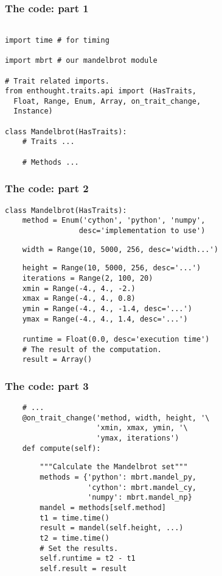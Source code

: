 \documentclass[14pt,compress]{beamer}
\newcounter{time}
\begin{document}
\begin{frame}
  \frametitle{The code: part 1}
  \vspace*{-3em}
\small
\begin{lstlisting}

import time # for timing

import mbrt # our mandelbrot module

# Trait related imports.
from enthought.traits.api import (HasTraits, 
  Float, Range, Enum, Array, on_trait_change,
  Instance)

class Mandelbrot(HasTraits):
    # Traits ...

    # Methods ...
  \end{lstlisting}
\end{frame}

\begin{frame}
  \frametitle{The code: part 2}
\small
\begin{lstlisting}
class Mandelbrot(HasTraits):
    method = Enum('cython', 'python', 'numpy', 
                 desc='implementation to use')
\end{lstlisting}
\pause
\vspace*{-1em}
\begin{lstlisting}
    width = Range(10, 5000, 256, desc='width...')
\end{lstlisting}
\pause
\vspace*{-1em}
\begin{lstlisting}
    height = Range(10, 5000, 256, desc='...')
    iterations = Range(2, 100, 20)
    xmin = Range(-4., 4., -2.)
    xmax = Range(-4., 4., 0.8)
    ymin = Range(-4., 4., -1.4, desc='...')
    ymax = Range(-4., 4., 1.4, desc='...')

    runtime = Float(0.0, desc='execution time')
    # The result of the computation.
    result = Array()
  \end{lstlisting}
\end{frame}

\begin{frame}
  \frametitle{The code: part 3}
\small
\begin{lstlisting}
    # ...
    @on_trait_change('method, width, height, '\
                     'xmin, xmax, ymin, '\
                     'ymax, iterations')
    def compute(self):
\end{lstlisting}
\pause
\vspace*{-1em}
\begin{lstlisting}
        """Calculate the Mandelbrot set"""
        methods = {'python': mbrt.mandel_py, 
                   'cython': mbrt.mandel_cy,
                   'numpy': mbrt.mandel_np}
        mandel = methods[self.method]
        t1 = time.time()
        result = mandel(self.height, ...)
        t2 = time.time()
        # Set the results.
        self.runtime = t2 - t1
        self.result = result
  \end{lstlisting}
\end{frame}
\end{document}
